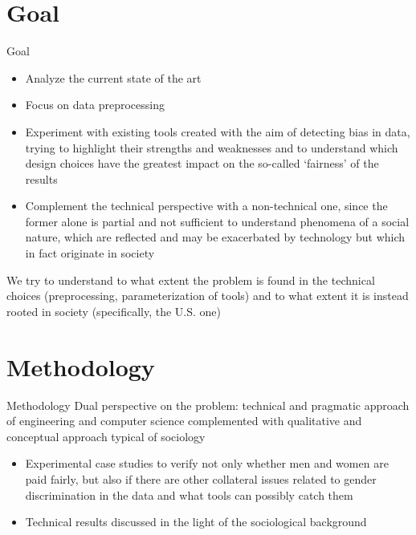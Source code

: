 \documentclass[usenames,dvipsnames]{beamer}
\begin{document}
    
    \section[]{Goal}
    \begin{frame}{Goal}
        \begin{itemize}
            \item Analyze the current state of the art
            \item Focus on data preprocessing
            \item Experiment with existing tools created with the aim of detecting bias in data, trying to highlight their strengths and weaknesses and to understand which design choices have the greatest impact on the so-called `\textcolor{defaultBlue}{fairness}' of the results
            \item Complement the technical perspective with a non-technical one, since the former alone is partial and not sufficient to understand phenomena of a social nature, which are reflected and may be exacerbated by technology but which in fact originate in society
        \end{itemize}
We try to understand to what extent the problem is found in the \alert{technical choices (preprocessing, parameterization of tools)} and to what extent it is instead rooted in \alert{society} (specifically, the U.S. one)
    \end{frame}
    
    
    \section[]{Methodology}
    \begin{frame}{Methodology}
        \textcolor{defaultBlue}{Dual perspective} on the problem: technical and pragmatic approach of engineering and computer science complemented with qualitative and conceptual approach typical of sociology
        	\begin{itemize}
        	    \item Experimental case studies to verify not only whether men and women are paid fairly, but also if there are other collateral issues related to gender discrimination in the data and what tools can possibly catch them
        	    \item Technical results discussed in the light of the sociological background
        	\end{itemize}
    \end{frame}
    
\end{document}
